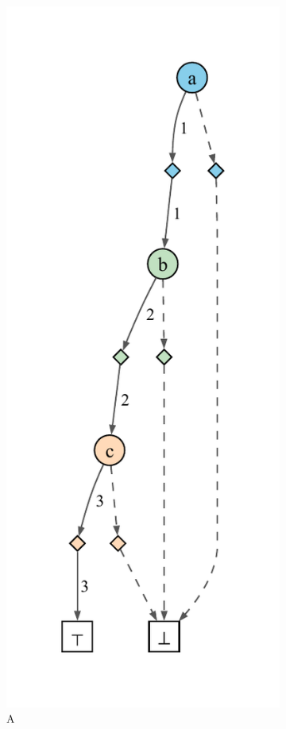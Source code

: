 \documentclass[acmsmall,dvipsnames,nonacm]{acmart}
\begin{document}
\begin{figure}
\begin{subfigure}[b]{0.16\textwidth}
        \includegraphics[scale=0.45]{deriv/derivsppA.pdf}
        \caption*{A}
    \end{subfigure}
    \begin{subfigure}[b]{0.25\textwidth}

\end{subfigure}
\end{figure}
\end{document}
